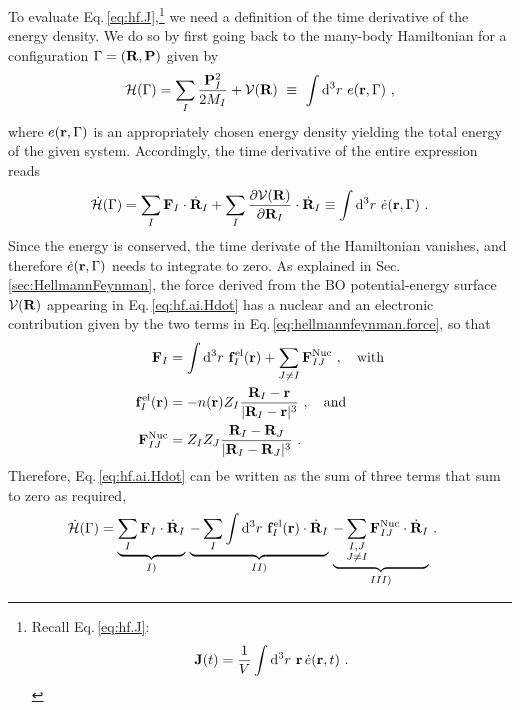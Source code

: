 To evaluate Eq.\,\eqref{eq:hf.J},\footnote{Recall Eq.\,\eqref{eq:hf.J}:$${\bf J} (t) 
	= \frac{1}{V} \int {\rm d}^3 r ~ {\bf r} \, \dot{e} ({\bf r}, t)~.$$} we need a definition of the time derivative of the energy density. We do so by first going back to the many-body Hamiltonian for a configuration $\Gamma = ({\bf R}, {\bf P})$ given by
\begin{align}
	\mathcal H (\Gamma) = \sum_I \frac{\b P_I^2}{2 M_I} + \mathcal V(\b R) 
		~\equiv~ \int \d^3 r ~ e (\b r, \Gamma)~,
  \label{eq:hf.ai.H}
\end{align}
where $e ({\bf r}, \Gamma)$ is an appropriately chosen energy density yielding the total energy of the given system. Accordingly, the time derivative of the entire expression reads
\begin{align}
	\dot{\mathcal H} (\Gamma)
		= \sum_I \b F_I \cdot \dot{\b R}_I 
		+ \sum_I \frac{\partial \mathcal V(\b R)}{\partial \b R_I} \cdot \dot{\b R}_I
			\label{eq:hf.ai.Hdot}
		\equiv
			\int \d^3 r ~ \dot{e} (\b r , \Gamma)~.
\end{align}
Since the energy is conserved, the time derivate of the Hamiltonian vanishes, and therefore $\dot{e} ({\bf r}, \Gamma)$ needs to integrate to zero.
As explained in Sec.\,\ref{sec:HellmannFeynman}, the force derived from the BO potential-energy surface $\mathcal V ({\bf R})$ appearing in Eq.\,\eqref{eq:hf.ai.Hdot} has a nuclear and an electronic contribution given by the two terms in Eq.\,\eqref{eq:hellmannfeynman.force}, so that
\begin{align}
	\b F_I
		&%
			= \int \d^3 r ~ \b f_I^{\rm el} (\b r) + \sum_{J \neq I} \b F_{IJ}^{\rm Nuc}~, \quad\text{with}
		\label{eq:hf.ai.F}\\
	\b f_I^{\rm el} (\b r)
		&= - n(\b r) Z_I \frac{\b R_I - \b r}{\lvert \b R_I - \b r \rvert^3}~,
		\label{eq:hf.ai.Fel}
		\quad\text{and} \\
	\b F_{IJ}^{\rm Nuc}
		&= Z_I Z_J \frac{\b R_I - \b R_J}{\lvert \b R_I - \b R_J \rvert^3}~.
		\label{eq:hf.ai.Fnuc}
\end{align}
Therefore, Eq.\,\eqref{eq:hf.ai.Hdot} can be written as the sum of three terms that sum to zero as required,
\begin{align}
	\dot{\mathcal H} (\Gamma)
		&= \underset{I)}{\underbrace{\sum_I {\bf F}_I \cdot \dot{{\bf R}}_I}} ~ 
			 \underset{II)}{\underbrace{-\sum_{I} \int {\rm d}^3 r ~ {\bf f}_I^{\rm el} ({\bf r}) \cdot \dot{{\bf R}}_I}} ~
			 \underset{III)}{\underbrace{-\sum_{\substack{I, J \\ J \neq I}} {\bf F}^{\rm Nuc}_{IJ} \cdot \dot{{\bf R}}_I}}~.
\end{align}
